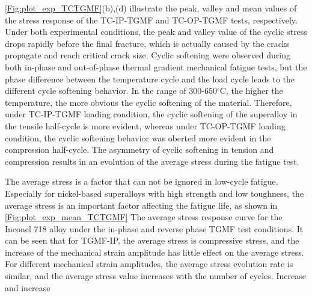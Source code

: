 \ref{Fig:plot_exp_TCTGMF}(b),(d) illustrate the peak, valley and mean values of the stress response of the TC-IP-TGMF and TC-OP-TGMF tests, respectively.
Under both experimental conditions, the peak and valley value of the cyclic stress drops rapidly before the final fracture, which is actually caused by the cracks propagate and reach critical crack size.
Cyclic softening were observed during both in-phase and out-of-phase thermal gradient mechanical fatigue tests, but the phase difference between the temperature cycle and the load cycle leads to the different cycle softening behavior. In the range of 300-650$^\circ$C, the higher the temperature, the more obvious the cyclic softening of the material. Therefore, under TC-IP-TGMF loading condition, the cyclic softening of the superalloy in the tensile half-cycle is more evident, whereas under TC-OP-TGMF loading condition, the cyclic softening behavior was oberted more evident in the compression half-cycle. The asymmetry of cyclic softening in tension and compression results in an evolution of the average stress during the fatigue test.


The average stress is a factor that can not be ignored in low-cycle fatigue. Especially for nickel-based superalloys with high strength and low toughness, the average stress is an important factor affecting the fatigue life, as shown in \ref{Fig:plot_exp_mean_TCTGMF} The average stress response curve for the Inconel 718 alloy under the in-phase and reverse phase TGMF test conditions. It can be seen that for TGMF-IP, the average stress is compressive stress, and the increase of the mechanical strain amplitude has little effect on the average stress. For different mechanical strain amplitudes, the average stress evolution rate is similar, and the average stress value increases with the number of cycles. Increase and increase

